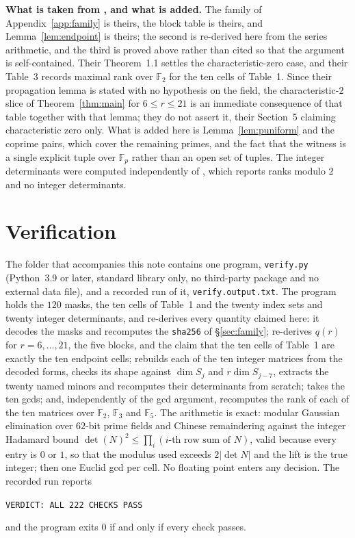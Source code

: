 \documentclass[11pt]{amsart}
\theoremstyle{remark}
\newcommand{\FF}{\mathbb F}
\begin{document}
\medskip\noindent\textbf{What is taken from \cite{WZ}, and what is added.} The
family of Appendix~\ref{app:family} is theirs, the block table is theirs, and
Lemma~\ref{lem:endpoint} is theirs; the second is re-derived here from the series
arithmetic, and the third is proved above rather than cited so that the argument
is self-contained. Their Theorem~1.1 settles the characteristic-zero case, and
their Table~3 records maximal rank over $\FF_2$ for the ten cells of Table~1.
Since their propagation lemma is stated with no hypothesis on the field, the
characteristic-$2$ slice of Theorem~\ref{thm:main} for $6\le r\le21$ is an
immediate consequence of that table together with that lemma; they do not assert
it, their Section~5 claiming characteristic zero only. What is added here is
Lemma~\ref{lem:puniform} and the coprime pairs, which cover the remaining
primes, and the fact that the witness is a single explicit tuple over $\FF_p$
rather than an open set of tuples. The integer determinants were computed
independently of \cite{WZ},
which reports ranks modulo $2$ and no integer determinants.

\section{Verification}

The folder that accompanies this note contains one program, \texttt{verify.py}
(Python~3.9 or later, standard library only, no third-party package and no
external data file), and a recorded run of it, \texttt{verify.output.txt}. The
program holds the $120$ masks, the ten cells of Table~1 and the twenty index sets
and twenty integer determinants, and re-derives every quantity claimed here: it
decodes the masks and recomputes the \texttt{sha256} of \S\ref{sec:family};
re-derives $q(r)$ for $r=6,\dots,21$, the five blocks, and the claim that the ten
cells of Table~1 are exactly the ten endpoint cells; rebuilds each of the ten
integer matrices from the decoded forms, checks its shape against $\dim S_j$ and
$r\dim S_{j-7}$, extracts the twenty named minors and recomputes their
determinants from scratch; takes the ten gcds; and, independently of the gcd
argument, recomputes the rank of each of the ten matrices over $\FF_2$, $\FF_3$
and $\FF_5$. The arithmetic is exact: modular Gaussian elimination over $62$-bit
prime fields and Chinese remaindering against the integer Hadamard bound
$\det(N)^2\le\prod_i(\text{$i$-th row sum of }N)$, valid because every entry is
$0$ or $1$, so that the modulus used exceeds $2|\det N|$ and the lift is the true
integer; then one Euclid gcd per cell. No floating point enters any decision. The
recorded run reports
\begin{center}
\texttt{VERDICT: ALL 222 CHECKS PASS}
\end{center}
and the program exits $0$ if and only if every check passes.
\end{document}
